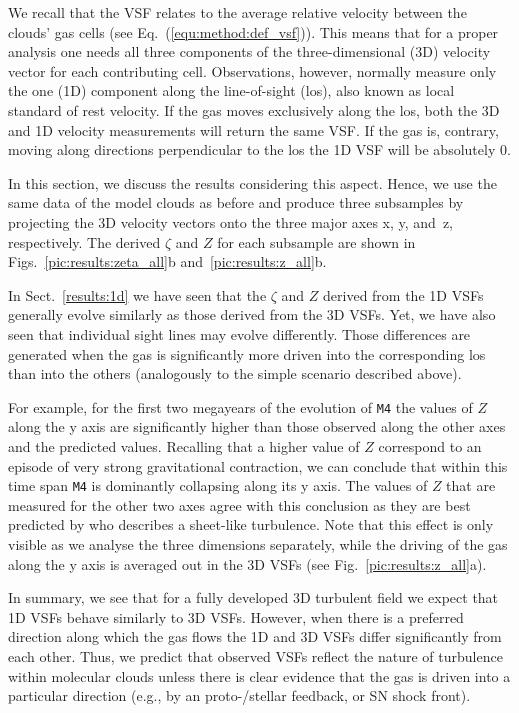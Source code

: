 We recall that the VSF relates to the average relative velocity between the clouds' gas cells (see Eq.~(\ref{equ:method:def_vsf})).
This means that for a proper analysis one needs all three components of the three-dimensional (3D) velocity vector for each contributing cell.
Observations, however, normally measure only the one (1D) component along the line-of-sight (los), also known as local standard of rest velocity.
If the gas moves exclusively along the los, both the 3D and 1D velocity measurements will return the same VSF. 
If the gas is, contrary, moving along directions perpendicular to the los the 1D VSF will be absolutely 0.
 
In this section, we discuss the results considering this aspect.
Hence, we use the same data of the model clouds as before and produce three subsamples by projecting the 3D velocity vectors onto the three major axes x, y, and~z, respectively.
The derived $\zeta$ and $Z$ for each subsample are shown in Figs.~\ref{pic:results:zeta_all}b and~\ref{pic:results:z_all}b.

In Sect.~\ref{results:1d} we have seen that the $\zeta$ and $Z$ derived from the 1D VSFs generally evolve similarly as those derived from the 3D VSFs.
Yet, we have also seen that individual sight lines may evolve differently.
Those differences are generated when the gas is significantly more driven into the corresponding los than into the others (analogously to the simple scenario described above). 

For example, for the first two megayears of the evolution of \texttt{M4} the values of $Z$ along the y axis are significantly higher than those observed along the other axes and the predicted values.
Recalling that a higher value of $Z$ correspond to an episode of very strong gravitational contraction, we can conclude that within this time span \texttt{M4} is dominantly collapsing along its y axis. 
The values of $Z$ that are measured for the other two axes agree with this conclusion as they are best predicted by \citet{Boldyrev2002} who describes a sheet-like turbulence. 
Note that this effect is only visible as we analyse the three dimensions separately, while the driving of the gas along the y axis is averaged out in the 3D VSFs (see Fig.~\ref{pic:results:z_all}a).

In summary, we see that for a fully developed 3D turbulent field we expect that 1D VSFs behave similarly to 3D VSFs.
However, when there is a preferred direction along which the gas flows the 1D and 3D VSFs differ significantly from each other. 
Thus, we predict that observed VSFs reflect the nature of turbulence within molecular clouds unless there is clear evidence that the gas is driven into a particular direction (e.g., by an proto-/stellar feedback, or SN shock front).

